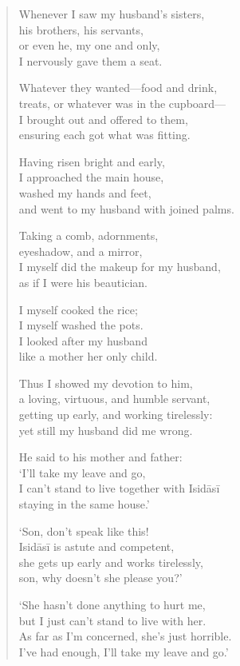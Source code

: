 \documentclass[12pt,openany]{book}%
\begin{document}
\begin{verse}
Whenever I saw my husband’s sisters, \\
his brothers, his servants, \\
or even he, my one and only, \\
I nervously gave them a seat. 

Whatever they wanted—food and drink, \\
treats, or whatever was in the cupboard—\\
I brought out and offered to them, \\
ensuring each got what was fitting. 

Having risen bright and early, \\
I approached the main house, \\
washed my hands and feet, \\
and went to my husband with joined palms. 

Taking a comb, adornments, \\
eyeshadow, and a mirror, \\
I myself did the makeup for my husband, \\
as if I were his beautician. 

I myself cooked the rice; \\
I myself washed the pots. \\
I looked after my husband \\
like a mother her only child. 

Thus I showed my devotion to him, \\
a loving, virtuous, and humble servant, \\
getting up early, and working tirelessly: \\
yet still my husband did me wrong. 

He said to his mother and father: \\
‘I’ll take my leave and go, \\
I can’t stand to live together with \textsanskrit{Isidāsī} \\
staying in the same house.’ 

‘Son, don’t speak like this! \\
\textsanskrit{Isidāsī} is astute and competent, \\
she gets up early and works tirelessly, \\
son, why doesn’t she please you?’ 

‘She hasn’t done anything to hurt me, \\
but I just can’t stand to live with her. \\
As far as I’m concerned, she’s just horrible. \\
I’ve had enough, I’ll take my leave and go.’ 


\end{verse}
\end{document}
